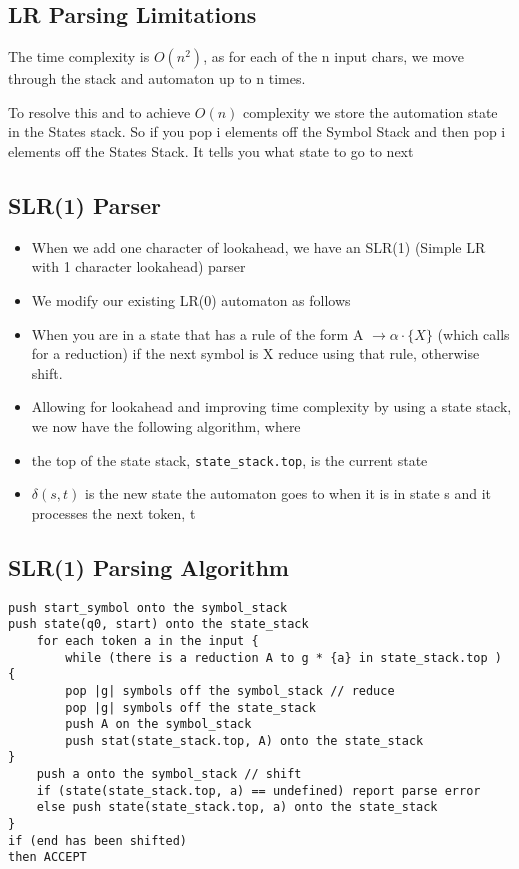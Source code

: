 \documentclass{article}
\begin{document}
\subsection*{LR Parsing Limitations}
The time complexity is \(O(n^2)\), as for each of the n input chars, we move through the stack and automaton up to n times. 

To resolve this and to achieve \(O(n)\) complexity we store the automation state in the States stack. So if you pop i elements off the Symbol Stack and then pop i elements off the States Stack. It tells you what state to go to next 

\subsection{SLR(1) Parser}
\begin{itemize}
\item When we add one character of lookahead, we have an SLR(1)
(Simple LR with 1 character lookahead) parser
\item We modify our existing LR(0) automaton as follows
\item When you are in a state that has a rule of the form
A \(\rightarrow \alpha \cdot  \{X\}\) (which calls for a reduction) if the next
symbol is X reduce using that rule, otherwise shift.
\item Allowing for lookahead and improving time complexity by using
a state stack, we now have the following algorithm, where
\item the top of the state stack, \verb|state_stack.top|, is the current state
\item \(\delta(s, t)\) is the new state the automaton goes to when it is in
state s and it processes the next token, t
\end{itemize}

\subsection*{SLR(1) Parsing Algorithm}
\begin{lstlisting}
push start_symbol onto the symbol_stack
push state(q0, start) onto the state_stack
	for each token a in the input {
		while (there is a reduction A to g * {a} in state_stack.top ) {
		pop |g| symbols off the symbol_stack // reduce
		pop |g| symbols off the state_stack
		push A on the symbol_stack
		push stat(state_stack.top, A) onto the state_stack
}
	push a onto the symbol_stack // shift
	if (state(state_stack.top, a) == undefined) report parse error
	else push state(state_stack.top, a) onto the state_stack
}
if (end has been shifted)
then ACCEPT
\end{lstlisting}
\end{document}
